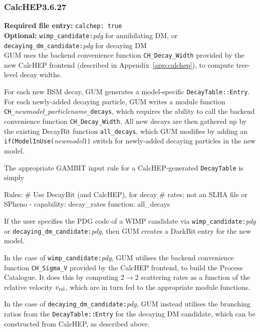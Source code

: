 \documentclass[pdftex,twocolumn,epjc3_preprint,runningheads]{svjour3}
\renewcommand{\_}{\discretionary{\underscore}{}{\underscore}}
\newcommand\cpp[1]{{\lstinline!#1!}}  %
\newcommand\term[1]{{\lstset{style=terminal}\lstinline!#1!\lstset{style=cpp}}}
\newcommand\guminline[1]{{{\lstset{style=gum}\lstinline!#1!}}}
\newcommand{\metavarf}[1]{\textit{\color{darkgreen}\footnotesize\textrm{#1}}}
\newcommand{\metavar}{\metavarf}
\newcommand{\gambit}{\textsf{GAMBIT}\xspace}
\newcommand{\darkbit}{\textsf{DarkBit}\xspace}
\newcommand{\decaybit}{\textsf{DecayBit}\xspace}
\newcommand{\gum}{\textsf{GUM}\xspace}
\newcommand{\dgum}{\!\!\term{.gum}\!\xspace}
\newcommand{\CH}{\textsf{CalcHEP}\xspace}
\newcommand{\nm}{\metavar{new\_model}}
\newcommand{\pn}{\metavar{particle\_name}}
\begin{document}
\subsubsection{\CH \textsf{3.6.27}}

\textbf{Required \dgum file entry:} \guminline{calchep: true} \\
\textbf{Optional:} \guminline{wimp_candidate:}\metavar{pdg} for annihilating DM, or  \guminline{decaying_dm_candidate:}\metavar{pdg} for decaying DM \\

\gum uses the backend convenience function \cpp{CH_Decay_Width} provided by the new \CH frontend (described in Appendix~\ref{app:calchep}), to compute tree-level decay widths.

For each new BSM decay, \gum generates a model-specific \cpp{DecayTable::Entry}. For each newly-added decaying particle, \gum writes a module function \cpp{CH_}\nm\cpp{_}\pn\cpp{_decays}, which requires the ability to call the backend convenience function \cpp{CH_Decay_Width}. All new decays are then gathered up by the existing \decaybit function \cpp{all_decays}, which \gum modifies by adding an \cpp{if(ModelInUse(}\nm\cpp{))} switch for newly-added decaying particles in the new model.

The appropriate \gambit input rule for a \CH-generated \cpp{DecayTable} is simply
%
\begin{lstyaml}
Rules:
  # Use DecayBit (and CalcHEP), for decay
  # rates; not an SLHA file or SPheno
  - capability: decay_rates
    function:   all_decays
\end{lstyaml}

If the user specifies the PDG code of a WIMP candidate via \guminline{wimp_candidate:}\metavar{pdg} or \guminline{decaying_dm_candidate:}\metavar{pdg}, then \gum creates a \darkbit entry for the new model.

In the case of \guminline{wimp_candidate:}\metavar{pdg}, \gum utilises the backend convenience function \cpp{CH_Sigma_V} provided by the \CH frontend, to build the Process Catalogue. It does this by computing $2\rightarrow2$ scattering rates as a function of the relative velocity $v_{\rm{rel}}$, which are in turn fed to the appropriate module functions.

In the case of \guminline{decaying_dm_candidate:}\metavar{pdg}, \gum instead utilises the branching ratios from the \cpp{DecayTable::Entry} for the decaying DM candidate, which can be constructed from \CH, as described above.
\end{document}
